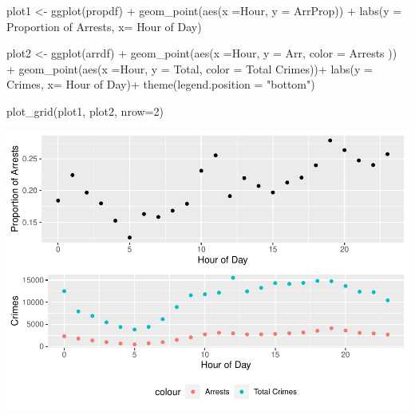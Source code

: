 \documentclass[
]{article}
\newenvironment{Shaded}{\begin{snugshade}}{\end{snugshade}}
\newcommand{\AttributeTok}[1]{\textcolor[rgb]{0.77,0.63,0.00}{#1}}
\newcommand{\DecValTok}[1]{\textcolor[rgb]{0.00,0.00,0.81}{#1}}
\newcommand{\FunctionTok}[1]{\textcolor[rgb]{0.00,0.00,0.00}{#1}}
\newcommand{\NormalTok}[1]{#1}
\newcommand{\OtherTok}[1]{\textcolor[rgb]{0.56,0.35,0.01}{#1}}
\newcommand{\SpecialCharTok}[1]{\textcolor[rgb]{0.00,0.00,0.00}{#1}}
\newcommand{\StringTok}[1]{\textcolor[rgb]{0.31,0.60,0.02}{#1}}
\begin{document}
\begin{Shaded}
\begin{Highlighting}[]
\NormalTok{plot1 }\OtherTok{\textless{}{-}} \FunctionTok{ggplot}\NormalTok{(propdf) }\SpecialCharTok{+} \FunctionTok{geom\_point}\NormalTok{(}\FunctionTok{aes}\NormalTok{(}\AttributeTok{x =}\NormalTok{Hour, }\AttributeTok{y =}\NormalTok{ ArrProp)) }\SpecialCharTok{+} \FunctionTok{labs}\NormalTok{(}\AttributeTok{y =} \StringTok{\textquotesingle{}Proportion of Arrests\textquotesingle{}}\NormalTok{, }\AttributeTok{x=} \StringTok{\textquotesingle{}Hour of Day\textquotesingle{}}\NormalTok{)}

\NormalTok{plot2 }\OtherTok{\textless{}{-}} \FunctionTok{ggplot}\NormalTok{(arrdf) }\SpecialCharTok{+} \FunctionTok{geom\_point}\NormalTok{(}\FunctionTok{aes}\NormalTok{(}\AttributeTok{x =}\NormalTok{Hour, }\AttributeTok{y =}\NormalTok{ Arr, }\AttributeTok{color =} \StringTok{\textquotesingle{}Arrests\textquotesingle{}}\NormalTok{ )) }\SpecialCharTok{+} \FunctionTok{geom\_point}\NormalTok{(}\FunctionTok{aes}\NormalTok{(}\AttributeTok{x =}\NormalTok{Hour, }\AttributeTok{y =}\NormalTok{ Total, }\AttributeTok{color =} \StringTok{\textquotesingle{}Total Crimes\textquotesingle{}}\NormalTok{))}\SpecialCharTok{+} \FunctionTok{labs}\NormalTok{(}\AttributeTok{y =} \StringTok{\textquotesingle{}Crimes\textquotesingle{}}\NormalTok{, }\AttributeTok{x=} \StringTok{\textquotesingle{}Hour of Day\textquotesingle{}}\NormalTok{)}\SpecialCharTok{+} \FunctionTok{theme}\NormalTok{(}\AttributeTok{legend.position =} \StringTok{"bottom"}\NormalTok{)}

\FunctionTok{plot\_grid}\NormalTok{(plot1, plot2, }\AttributeTok{nrow=}\DecValTok{2}\NormalTok{)}
\end{Highlighting}
\end{Shaded}

\includegraphics{rahil_notebook_files/figure-latex/unnamed-chunk-6-1.pdf}
\end{document}
